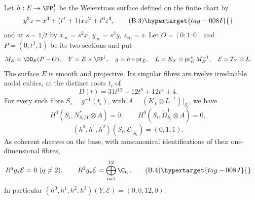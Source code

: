 \begin{proposition}\hypertarget{tag-01BL}{}\label{cdp:st:B2}

Let $h:E\to\PP^1_t$ be the Weierstrass surface defined on the finite chart by
\[
 y^2z=x^3+(t^4+1)xz^2+t^6z^3,                          \tag{B.3}\hypertarget{tag-008I}{}\label{cdp:eq:B.3}
\]
and at $s=1/t$ by $x_\infty=s^2x$, $y_\infty=s^3y$, $z_\infty=z$. Let $O=[0:1:0]$ and $P=(0,t^3,1)$ be its two sections and put
\[
 M_E=\OO_E(P-O),\quad Y=E\times\PP^1,\quad
 g=h\circ\operatorname{pr}_E,\quad
 L=K_Y\otimes\operatorname{pr}_E^*M_E^{-1},\quad
 \mathcal E=T_Y\otimes L.
\]
The surface $E$ is smooth and projective. Its singular fibres are twelve irreducible nodal cubics, at the distinct roots $t_i$ of
\[
 D(t)=31t^{12}+12t^8+12t^4+4.
\]
For every such fibre $S_i=g^{-1}(t_i)$, with $A=(K_Y\otimes L^{-1})|_{S_i}$, we have
\[
H^0(S_i,N^*_{S_i/Y}\otimes A)=0,
\qquad H^0(S_i,\widetilde\Omega^1_{S_i}\otimes A)=0,
\]
\[
 (h^0,h^1,h^2)(S_i,\mathcal E|_{S_i})=(0,1,1).
\]
As coherent sheaves on the base, with noncanonical identifications of their one-dimensional fibres,
\[
 R^qg_*\mathcal E=0\ (q\ne2),\qquad
 R^2g_*\mathcal E=\bigoplus_{i=1}^{12}\C_{t_i}.        \tag{B.4}\hypertarget{tag-008J}{}\label{cdp:eq:B.4}
\]
In particular $(h^0,h^1,h^2,h^3)(Y,\mathcal E)=(0,0,12,0)$.
\end{proposition}



